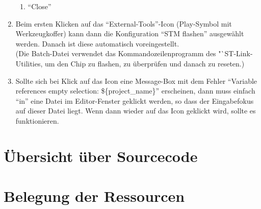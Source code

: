 \begin{enumerate}
\begin{enumerate}
			\item "`Close"'
		\end{enumerate}
	\item Beim ersten Klicken auf das "`External-Tools"'-Icon (Play-Symbol mit Werkzeugkoffer) kann dann die Konfiguration "`STM flashen"' ausgewählt werden. Danach ist diese automatisch voreingestellt.\\(Die Batch-Datei verwendet das Kommandozeilenprogramm des "`ST-Link-Utilities, um den Chip zu flashen, zu überprüfen und danach zu reseten.)
	\item Sollte sich bei Klick auf das Icon eine Message-Box mit dem Fehler "`Variable references empty selection: \$\{project\_name\}"' erscheinen, dann muss einfach "`in"' eine Datei im Editor-Fenster geklickt werden, so dass der Eingabefokus auf dieser Datei liegt. Wenn dann wieder auf das Icon geklickt wird, sollte es funktionieren.
\end{enumerate}



\section{Übersicht über Sourcecode}


\section{Belegung der Ressourcen}


